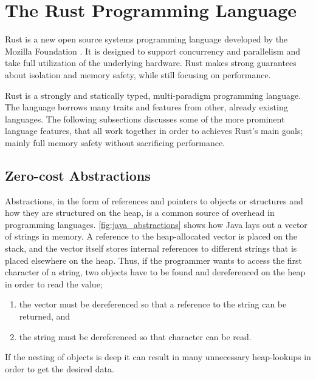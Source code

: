 
\section{The Rust Programming Language} %
\label{sub:the_rust_programming_language}

Rust \cite{web:rust_lang} is a new open source systems programming language developed by the Mozilla Foundation \cite{web:mozilla_foundation}.
It is designed to support concurrency and parallelism and take full utilization of the underlying hardware.
Rust makes strong guarantees about isolation and memory safety, while still focusing on performance.

Rust is a strongly and statically typed, multi-paradigm programming language.
The language borrows many traits and features from other, already existing languages.
The following subsections discusses some of the more prominent language features, that all work together in order to achieves Rust's main goals; mainly full memory safety without sacrificing performance.

\subsection{Zero-cost Abstractions}
\label{chap:zero_cost_abstractions}

Abstractions, in the form of references and pointers to objects or structures and how they are
structured on the heap, is a common source of overhead in programming languages.
\autoref{fig:java_abstractions}  shows how Java lays out a vector of
strings in memory.
A reference to the heap-allocated vector is placed on the stack, and the vector itself stores internal references to different strings that is placed elsewhere on the heap.
Thus, if the programmer wants to access the first character of a string, two objects have to be found and dereferenced on the heap in order to read the value;

\begin{enumerate}
  \item the vector must be dereferenced so that a reference to the string can be returned, and
  \item the string must be dereferenced so that character can be read.
\end{enumerate}

If the nesting of objects is deep it can result in many unnecessary heap-lookups in order to get the desired data.


